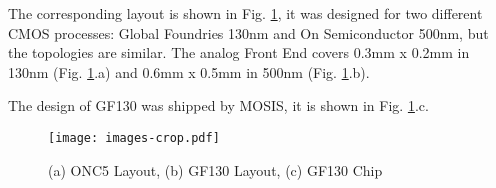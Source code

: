 The corresponding layout \cite{dali_man} is shown in Fig. \ref{fig:layout}, it was designed for two different CMOS processes: Global Foundries 130nm and On Semiconductor 500nm, but the topologies are similar. The analog Front End covers 0.3mm x 0.2mm in 130nm (Fig. \ref{fig:layout}.a) and 0.6mm x 0.5mm in 500nm (Fig. \ref{fig:layout}.b).

The design of GF130 was shipped by MOSIS, it is shown in Fig. \ref{fig:layout}.c. 

\begin{figure}[h]
  \centering
  \texttt{[image: images-crop.pdf]}
  \caption{(a) ONC5 Layout, (b) GF130 Layout, (c) GF130 Chip}
  \label{fig:layout}
\end{figure}